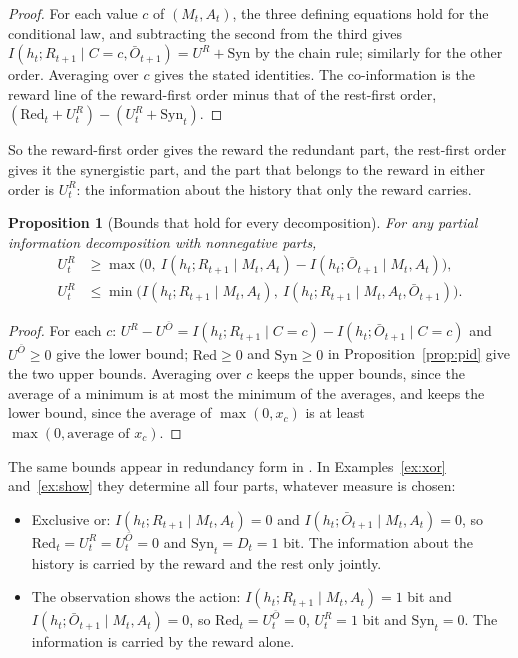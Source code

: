 \documentclass{article}
\newtheorem{proposition}{Proposition}
\theoremstyle{definition}
\theoremstyle{remark}
\newcommand{\Ob}{\bar O}
\begin{document}
\begin{proof}
For each value $c$ of $(M_t,A_t)$, the three defining equations hold for the conditional law, and subtracting the second from the third gives $I(h_t;R_{t+1}\mid C=c,\Ob_{t+1})=U^R+\mathrm{Syn}$ by the chain rule; similarly for the other order. Averaging over $c$ gives the stated identities. The co-information is the reward line of the reward-first order minus that of the rest-first order, $(\mathrm{Red}_t+U^R_t)-(U^R_t+\mathrm{Syn}_t)$.
\end{proof}

So the reward-first order gives the reward the redundant part, the rest-first order gives it the synergistic part, and the part that belongs to the reward in either order is $U^R_t$: the information about the history that only the reward carries.

\begin{proposition}[Bounds that hold for every decomposition]\label{prop:pid-bounds}
For any partial information decomposition with nonnegative parts,
\begin{align*}
U^R_t&\ge\max\big(0,\ I(h_t;R_{t+1}\mid M_t,A_t)-I(h_t;\Ob_{t+1}\mid M_t,A_t)\big),\\
U^R_t&\le\min\big(I(h_t;R_{t+1}\mid M_t,A_t),\ I(h_t;R_{t+1}\mid M_t,A_t,\Ob_{t+1})\big).
\end{align*}
\end{proposition}

\begin{proof}
For each $c$: $U^R-U^{\Ob}=I(h_t;R_{t+1}\mid C=c)-I(h_t;\Ob_{t+1}\mid C=c)$ and $U^{\Ob}\ge0$ give the lower bound; $\mathrm{Red}\ge0$ and $\mathrm{Syn}\ge0$ in Proposition~\ref{prop:pid} give the two upper bounds. Averaging over $c$ keeps the upper bounds, since the average of a minimum is at most the minimum of the averages, and keeps the lower bound, since the average of $\max(0,x_c)$ is at least $\max(0,\text{average of }x_c)$.
\end{proof}

The same bounds appear in redundancy form in \citet[Lemma~1]{matthias2025novel}. In Examples~\ref{ex:xor} and~\ref{ex:show} they determine all four parts, whatever measure is chosen:
\begin{itemize}
\item Exclusive or: $I(h_t;R_{t+1}\mid M_t,A_t)=0$ and $I(h_t;\Ob_{t+1}\mid M_t,A_t)=0$, so $\mathrm{Red}_t=U^R_t=U^{\Ob}_t=0$ and $\mathrm{Syn}_t=D_t=1$ bit. The information about the history is carried by the reward and the rest only jointly.
\item The observation shows the action: $I(h_t;R_{t+1}\mid M_t,A_t)=1$ bit and $I(h_t;\Ob_{t+1}\mid M_t,A_t)=0$, so $\mathrm{Red}_t=U^{\Ob}_t=0$, $U^R_t=1$ bit and $\mathrm{Syn}_t=0$. The information is carried by the reward alone.
\end{itemize}
\end{document}
